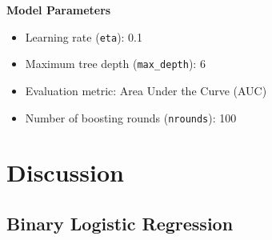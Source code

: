 \documentclass[12pt]{article}
\begin{document}
\textbf{Model Parameters}
\begin{itemize}
	\item Learning rate (\texttt{eta}): 0.1
	\item Maximum tree depth (\texttt{max\_depth}): 6
	\item Evaluation metric: Area Under the Curve (AUC)
	\item Number of boosting rounds (\texttt{nrounds}): 100
\end{itemize}

\section{Discussion}
\subsection{Binary Logistic Regression}
\end{document}
